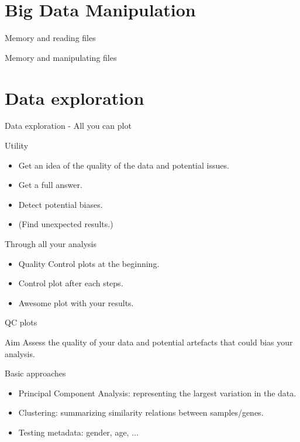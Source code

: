 \documentclass[10pt]{beamer}
\begin{document}
\section{Big Data Manipulation}

\begin{frame}{Memory and reading files}
  
\end{frame}

\begin{frame}{Memory and manipulating files}
  
\end{frame}




\section{Data exploration}

\begin{frame}{Data exploration - All you can plot}
  \begin{block}{Utility}
    \begin{itemize}
    \item Get an idea of the quality of the data and potential issues.
    \item Get a full answer.
    \item Detect potential biases.
    \item (Find unexpected results.)
    \end{itemize}
  \end{block}
  
  \begin{block}{Through all your analysis}
    \begin{itemize}
    \item Quality Control plots at the beginning.
    \item Control plot after each steps.
    \item Awesome plot with your results.
    \end{itemize}
  \end{block}
\end{frame}

\begin{frame}{QC plots}
  \begin{block}{Aim}
    Assess the quality of your data and potential artefacts that could bias your analysis.
  \end{block}
  \begin{block}{Basic approaches}
    \begin{itemize}
    \item Principal Component Analysis: representing the largest variation in the data.
    \item Clustering: summarizing similarity relations between samples/genes.
    \item Testing metadata: gender, age, ...
    \end{itemize}
  \end{block}
\end{frame}
\end{document}
